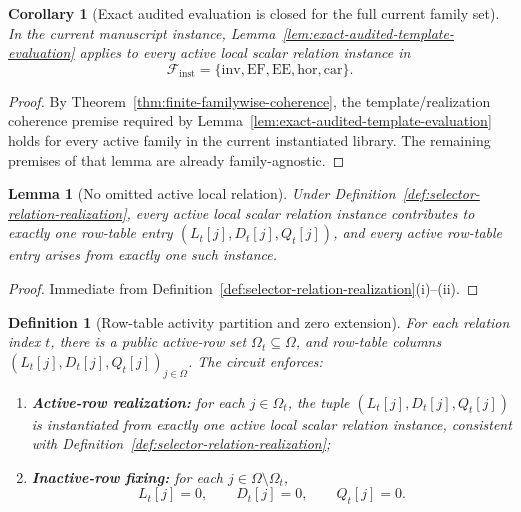 ﻿\documentclass[11pt]{article}
\newtheorem{lemma}[theorem]{Lemma}
\newtheorem{corollary}[theorem]{Corollary}
\newtheorem{definition}[theorem]{Definition}
\begin{document}
\begin{corollary}[Exact audited evaluation is closed for the full current family set]
\label{cor:exact-audited-eval-full-family-set}
In the current manuscript instance, Lemma~\ref{lem:exact-audited-template-evaluation}
applies to every active local scalar relation instance in
\[
\mathcal F_{\mathrm{inst}}
=
\{\mathrm{inv},\mathrm{EF},\mathrm{EE},\mathrm{hor},\mathrm{car}\}.
\]
\end{corollary}

\begin{proof}
By Theorem~\ref{thm:finite-familywise-coherence}, the template/realization
coherence premise required by Lemma~\ref{lem:exact-audited-template-evaluation}
holds for every active family in the current instantiated library. The remaining
premises of that lemma are already family-agnostic.
\end{proof}

\begin{lemma}[No omitted active local relation]
\label{lem:no-omitted-active-relation}
Under Definition~\ref{def:selector-relation-realization}, every active local
scalar relation instance contributes to exactly one row-table entry
\((L_t[j],D_t[j],Q_t[j])\), and every active row-table entry arises from exactly
one such instance.
\end{lemma}

\begin{proof}
Immediate from
Definition~\ref{def:selector-relation-realization}(i)--(ii).
\end{proof}

\begin{definition}[Row-table activity partition and zero extension]
\label{def:rowtable-zero-extension}
For each relation index \(t\), there is a public active-row set
\(\Omega_t\subseteq\Omega\), and row-table columns
\((L_t[j],D_t[j],Q_t[j])_{j\in\Omega}\). The circuit enforces:
\begin{enumerate}[label=(\roman*),leftmargin=2em]
    \item \textbf{Active-row realization:} for each \(j\in\Omega_t\), the tuple
    \((L_t[j],D_t[j],Q_t[j])\) is instantiated from exactly one active local
    scalar relation instance, consistent with
    Definition~\ref{def:selector-relation-realization};
    \item \textbf{Inactive-row fixing:} for each \(j\in\Omega\setminus\Omega_t\),
    \[
    L_t[j]=0,\qquad D_t[j]=0,\qquad Q_t[j]=0.
    \]
\end{enumerate}
\end{definition}
\end{document}
